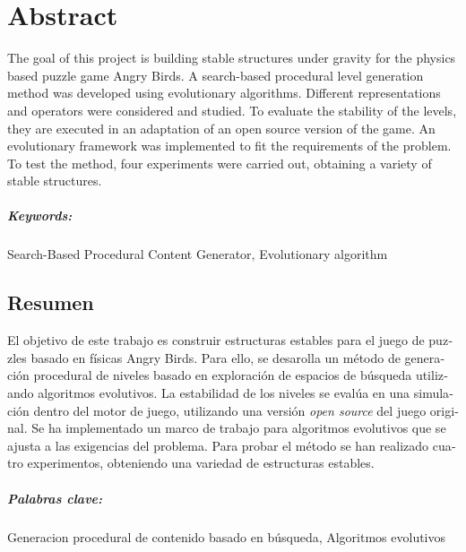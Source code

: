 \begingroup
\let\clearpage\relax
\let\cleardoublepage\relax
\let\cleardoublepage\relax

\chapter*{Abstract}
The goal of this project is building stable structures under gravity for the physics based puzzle game Angry Birds. A search-based procedural level generation method was developed using evolutionary algorithms. Different representations and operators were considered and studied. To evaluate the stability of the levels, they are executed in an adaptation of an open source version of the game. An evolutionary framework was implemented to fit the requirements of the problem. To test the method, four experiments were carried out, obtaining a variety of stable structures.


\paragraph{Keywords:} Search-Based Procedural Content Generator, Evolutionary algorithm

\vfill
\begin{otherlanguage}{ngerman}
\chapter*{Resumen}
El objetivo de este trabajo es construir estructuras estables para el juego de puzzles basado en físicas Angry Birds. Para ello, se desarolla un método de generación procedural de niveles basado en exploración de espacios de búsqueda utilizando algoritmos evolutivos. La estabilidad de los niveles se evalúa en una simulación dentro del motor de juego, utilizando una versión \textit{open source} del juego original. Se ha implementado un marco de trabajo para algoritmos evolutivos que se ajusta a las exigencias del problema. Para probar el método se han realizado cuatro experimentos, obteniendo una variedad de estructuras estables. 

\paragraph{Palabras clave:} Generacion procedural de contenido basado en búsqueda, Algoritmos evolutivos
\end{otherlanguage}

\endgroup

\vfill
